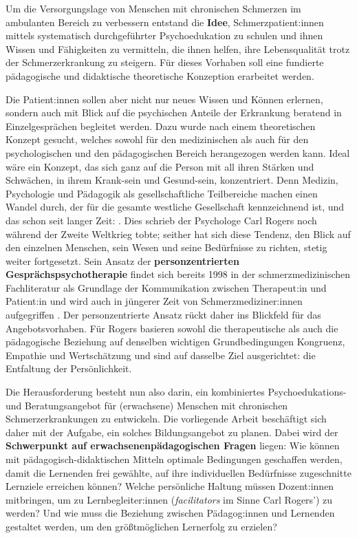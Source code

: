 \documentclass[
  twoside,
  parskip=half-,
  paper=176mm:246mm,
  BCOR=14mm,
  DIV=14,
]{scrreprt}
\begin{document}
    Um die Versorgungslage von Menschen mit chronischen Schmerzen im ambulanten Bereich zu verbessern entstand die \textbf{Idee}, Schmerzpatient:innen mittels systematisch durchgeführter Psychoedukation zu schulen und ihnen Wissen und Fähigkeiten zu vermitteln, die ihnen helfen, ihre Lebensqualität trotz der Schmerzerkrankung zu steigern. Für dieses Vorhaben soll eine fundierte pädagogische und didaktische theoretische Konzeption erarbeitet werden.
    
    Die Patient:innen sollen aber nicht nur neues Wissen und Können erlernen, sondern auch mit Blick auf die psychischen Anteile der Erkrankung beratend in Einzelgesprächen begleitet werden. Dazu wurde nach einem theoretischen Konzept gesucht, welches sowohl für den medizinischen als auch für den psychologischen und den pädagogischen Bereich herangezogen werden kann. Ideal wäre ein Konzept, das sich ganz auf die Person mit all ihren Stärken und Schwächen, in ihrem Krank-sein und Gesund-sein, konzentriert. Denn Medizin, Psychologie und Pädagogik als gesellschaftliche Teilbereiche machen einen Wandel durch, der für die gesamte westliche Gesellschaft kennzeichnend ist, und das schon seit langer Zeit: . Dies schrieb der Psychologe Carl Rogers noch während der Zweite Weltkrieg tobte; seither hat sich diese Tendenz, den Blick auf den einzelnen Menschen, sein Wesen und seine Bedürfnisse zu richten, stetig weiter fortgesetzt. Sein Ansatz der \textbf{personzentrierten Gesprächspsychotherapie} findet sich bereits 1998 in der schmerzmedizinischen Fachliteratur als Grundlage der Kommunikation zwischen Therapeut:in und Patient:in \autocite[vgl.][62-65]{schmerztherapie} und wird auch in jüngerer Zeit von Schmerzmediziner:innen aufgegriffen \autocite[vgl.][]{fussnegger}.
    Der personzentrierte Ansatz rückt daher ins Blickfeld für das Angebotsvorhaben. Für Rogers basieren sowohl die therapeutische als auch die pädagogische Beziehung auf denselben wichtigen Grundbedingungen Kongruenz, Empathie und Wertschätzung und sind auf dasselbe Ziel ausgerichtet: die Entfaltung der Persönlichkeit. 

Die Herausforderung besteht nun also darin, ein kombiniertes Psychoedukations- und Beratungsangebot für (erwachsene) Menschen mit chronischen Schmerzerkrankungen zu entwickeln. Die vorliegende Arbeit beschäftigt sich daher mit der Aufgabe, ein solches Bildungsangebot zu planen. Dabei wird der \textbf{Schwerpunkt auf erwachsenenpädagogischen Fragen} liegen: Wie können mit pädagogisch-didaktischen Mitteln optimale Bedingungen geschaffen werden, damit die Lernenden frei gewählte, auf ihre individuellen Bedürfnisse zugeschnitte Lernziele erreichen können? Welche persönliche Haltung müssen Dozent:innen mitbringen, um zu Lernbegleiter:innen (\textit{facilitators} im Sinne Carl Rogers') zu werden? Und wie muss die Beziehung zwischen Pädagog:innen und Lernenden gestaltet werden, um den größtmöglichen Lernerfolg zu erzielen?
\end{document}
